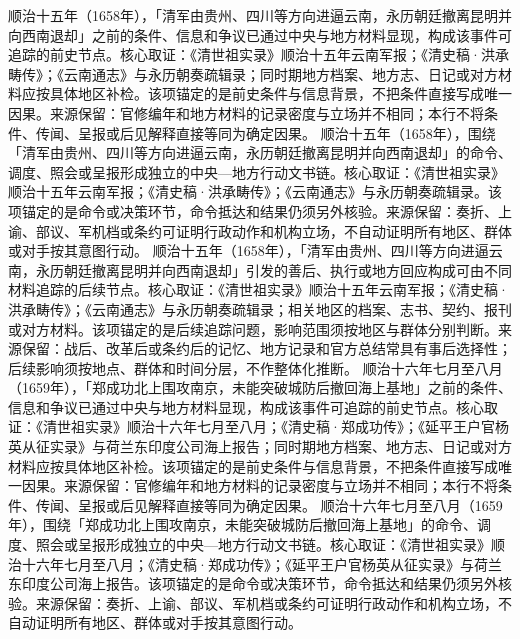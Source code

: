 顺治十五年（1658年），「清军由贵州、四川等方向进逼云南，永历朝廷撤离昆明并向西南退却」之前的条件、信息和争议已通过中央与地方材料显现，构成该事件可追踪的前史节点。核心取证：《清世祖实录》顺治十五年云南军报；《清史稿·洪承畴传》；《云南通志》与永历朝奏疏辑录；同时期地方档案、地方志、日记或对方材料应按具体地区补检。该项锚定的是前史条件与信息背景，不把条件直接写成唯一因果。来源保留：官修编年和地方材料的记录密度与立场并不相同；本行不将条件、传闻、呈报或后见解释直接等同为确定因果。
顺治十五年（1658年），围绕「清军由贵州、四川等方向进逼云南，永历朝廷撤离昆明并向西南退却」的命令、调度、照会或呈报形成独立的中央—地方行动文书链。核心取证：《清世祖实录》顺治十五年云南军报；《清史稿·洪承畴传》；《云南通志》与永历朝奏疏辑录。该项锚定的是命令或决策环节，命令抵达和结果仍须另外核验。来源保留：奏折、上谕、部议、军机档或条约可证明行政动作和机构立场，不自动证明所有地区、群体或对手按其意图行动。
顺治十五年（1658年），「清军由贵州、四川等方向进逼云南，永历朝廷撤离昆明并向西南退却」引发的善后、执行或地方回应构成可由不同材料追踪的后续节点。核心取证：《清世祖实录》顺治十五年云南军报；《清史稿·洪承畴传》；《云南通志》与永历朝奏疏辑录；相关地区的档案、志书、契约、报刊或对方材料。该项锚定的是后续追踪问题，影响范围须按地区与群体分别判断。来源保留：战后、改革后或条约后的记忆、地方记录和官方总结常具有事后选择性；后续影响须按地点、群体和时间分层，不作整体化推断。
顺治十六年七月至八月（1659年），「郑成功北上围攻南京，未能突破城防后撤回海上基地」之前的条件、信息和争议已通过中央与地方材料显现，构成该事件可追踪的前史节点。核心取证：《清世祖实录》顺治十六年七月至八月；《清史稿·郑成功传》；《延平王户官杨英从征实录》与荷兰东印度公司海上报告；同时期地方档案、地方志、日记或对方材料应按具体地区补检。该项锚定的是前史条件与信息背景，不把条件直接写成唯一因果。来源保留：官修编年和地方材料的记录密度与立场并不相同；本行不将条件、传闻、呈报或后见解释直接等同为确定因果。
顺治十六年七月至八月（1659年），围绕「郑成功北上围攻南京，未能突破城防后撤回海上基地」的命令、调度、照会或呈报形成独立的中央—地方行动文书链。核心取证：《清世祖实录》顺治十六年七月至八月；《清史稿·郑成功传》；《延平王户官杨英从征实录》与荷兰东印度公司海上报告。该项锚定的是命令或决策环节，命令抵达和结果仍须另外核验。来源保留：奏折、上谕、部议、军机档或条约可证明行政动作和机构立场，不自动证明所有地区、群体或对手按其意图行动。
